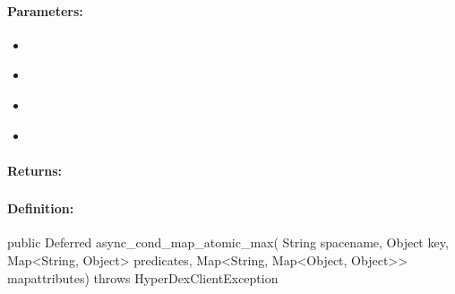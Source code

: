 \paragraph{Parameters:}
\begin{itemize}[noitemsep]
\item {}\\

\item {}\\

\item {}\\

\item {}\\

\end{itemize}

\paragraph{Returns:}


\pagebreak
\subsubsection{}
\label{api:java:async_cond_map_atomic_max}


\paragraph{Definition:}
\begin{javacode}
public Deferred async_cond_map_atomic_max(
        String spacename,
        Object key,
        Map<String, Object> predicates,
        Map<String, Map<Object, Object>> mapattributes) throws HyperDexClientException
\end{javacode}

